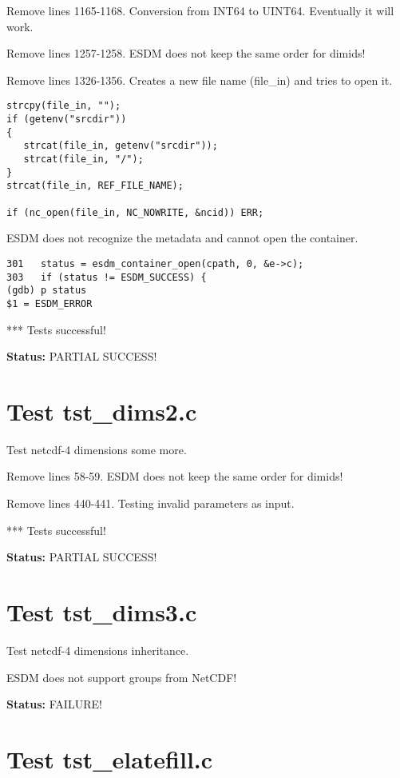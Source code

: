Remove lines 1165-1168. Conversion from INT64 to UINT64. Eventually it will work.

Remove lines 1257-1258. ESDM does not keep the same order for dimids!

Remove lines 1326-1356. Creates a new file name (file\_in) and tries to open it.

\begin{verbatim}
strcpy(file_in, "");
if (getenv("srcdir"))
{
   strcat(file_in, getenv("srcdir"));
   strcat(file_in, "/");
}
strcat(file_in, REF_FILE_NAME);

if (nc_open(file_in, NC_NOWRITE, &ncid)) ERR;
\end{verbatim}

ESDM does not recognize the metadata and cannot open the container.

\begin{verbatim}
301	  status = esdm_container_open(cpath, 0, &e->c);
303	  if (status != ESDM_SUCCESS) {
(gdb) p status
$1 = ESDM_ERROR
\end{verbatim}

*** Tests successful!

{\bf \large Status: } PARTIAL SUCCESS!

\section{Test tst\_dims2.c}

Test netcdf-4 dimensions some more.

Remove lines 58-59. ESDM does not keep the same order for dimids!

Remove lines 440-441. Testing invalid parameters as input.

*** Tests successful!

{\bf \large Status: } PARTIAL SUCCESS!

\section{Test tst\_dims3.c}

Test netcdf-4 dimensions inheritance.

ESDM does not support groups from NetCDF!

{\bf \large Status: } FAILURE!

\section{Test tst\_elatefill.c}

